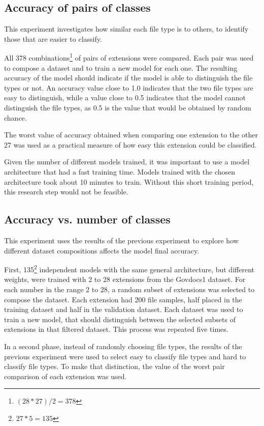\subsection{Accuracy of pairs of classes}
This experiment investigates how similar each file type is to others, to identify those that are easier to classify. 

All 378 combinations\footnote{$(28 * 27)/2 = 378$} of pairs of extensions were compared. Each pair was used to compose a dataset and to train a new model for each one. The resulting accuracy of the model should indicate if the model is able to distinguish the file types or not. An accuracy value close to 1.0 indicates that the two file types are easy to distinguish, while a value close to 0.5 indicates that the model cannot distinguish the file types, as 0.5 is the value that would be obtained by random chance.

The worst value of accuracy obtained when comparing one extension to the other 27 was used as a practical measure of how easy this extension could be classified.

Given the number of different models trained, it was important to use a model architecture that had a fast training time. Models trained with the chosen architecture took about 10 minutes to train. Without this short training period, this research step would not be feasible.

\subsection{Accuracy vs. number of classes}
This experiment uses the results of the previous experiment to explore how different dataset compositions affects the model final accuracy.

First, 135\footnote{$ 27 * 5 = 135$} independent models with the same general architecture, but different weights, were trained with 2 to 28 extensions from the Govdocs1 dataset. For each number in the range 2 to 28, a random subset of extensions was selected to compose the dataset. Each extension had 200 file samples, half placed in the training dataset and half in the validation dataset. Each dataset was used to train a new model, that should distinguish between the selected subsets of extensions in that filtered dataset. This process was repeated five times.

In a second phase, instead of randomly choosing file types, the results of the previous experiment were used to select easy to classify file types and hard to classify file types. To make that distinction, the value of the worst pair comparison of each extension was used. 

